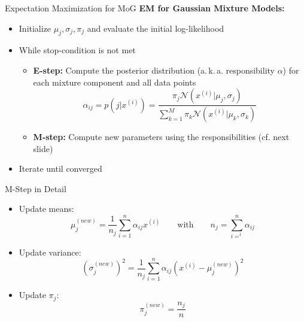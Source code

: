 \begin{frame}{Expectation Maximization for MoG}{}
	\textbf{EM for Gaussian Mixture Models:}
	\begin{itemize}
		\item Initialize $\mu_j, \sigma_j, \pi_j$ and evaluate the initial log-likelihood
		\item While stop-condition is not met
		\begin{itemize}
			\item \textbf{E-step:} Compute the posterior distribution (a.\,k.\,a. responsibility $\alpha$) for each mixture component and all data points
			\begin{equation}
				\alpha_{ij} = p(j \vert x^{(i)}) = \frac{\pi_j \mathcal{N}(x^{(i)} \vert \mu_j, \sigma_j)}{\sum_{k=1}^M \pi_k \mathcal{N}(x^{(i)} \vert \mu_k, \sigma_k)}
			\end{equation}
			\item \textbf{M-step:} Compute new parameters using the responsibilities (cf. next slide)
		\end{itemize}
		\item Iterate until converged
	\end{itemize}
\end{frame}


\begin{frame}{M-Step in Detail}{}
	\begin{itemize}
		\item Update means:
		\begin{equation}
			\mu_j^{(new)} = \frac{1}{n_j} \sum_{i=1}^n \alpha_{ij} x^{(i)} \qquad\text{with}\qquad n_j = \sum_{i=^1}^n \alpha_{ij}
		\end{equation}
		\item Update variance:
		\begin{equation}
			(\sigma_j^{(new)})^2 = \frac{1}{n_j} \sum_{i=1}^n \alpha_{ij} (x^{(i)} - \mu_j^{(new)})^2
		\end{equation}
		\item Update $\pi_j$:
		\begin{equation}
			\pi_j^{(new)} = \frac{n_j}{n}
		\end{equation}
	\end{itemize}
\end{frame}


